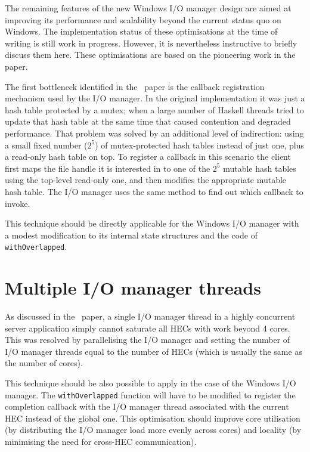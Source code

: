 \documentclass[a4paper,11pt,oneside]{report}
\begin{document}
The remaining features of the new Windows I/O manager design are aimed at
improving its performance and scalability beyond the current status quo on
Windows. The implementation status of these optimisations at the time of writing
is still work in progress. However, it is nevertheless instructive to briefly
discuss them here. These optimisations are based on the pioneering work in
the~\cite{bib:voellmy} paper.

The first bottleneck identified in the~\cite{bib:voellmy} paper is the callback
registration mechanism used by the I/O manager. In the original implementation
it was just a hash table protected by a mutex; when a large number of Haskell
threads tried to update that hash table at the same time that caused contention
and degraded performance. That problem was solved by an additional level of
indirection: using a small fixed number ($2^5$) of mutex-protected hash tables
instead of just one, plus a read-only hash table on top. To register a callback
in this scenario the client first maps the file handle it is interested in
to one of the $2^5$ mutable hash tables using the top-level read-only one, and
then modifies the appropriate mutable hash table. The I/O manager uses the same
method to find out which callback to invoke.

This technique should be directly applicable for the Windows I/O manager with a
modest modification to its internal state structures and the code of
\texttt{withOverlapped}.

\section{Multiple I/O manager threads}

As discussed in the~\cite{bib:voellmy} paper, a single I/O manager thread in a
highly concurrent server application simply cannot saturate all HECs with work
beyond 4 cores. This was resolved by parallelising the I/O manager and setting
the number of I/O manager threads equal to the number of HECs (which is usually
the same as the number of cores).

This technique should be also possible to apply in the case of the Windows I/O
manager. The \texttt{withOverlapped} function will have to be modified to
register the completion callback with the I/O manager thread associated with the
current HEC instead of the global one. This optimisation should improve core
utilisation (by distributing the I/O manager load more evenly across cores) and
locality (by minimising the need for cross-HEC communication).
\end{document}
